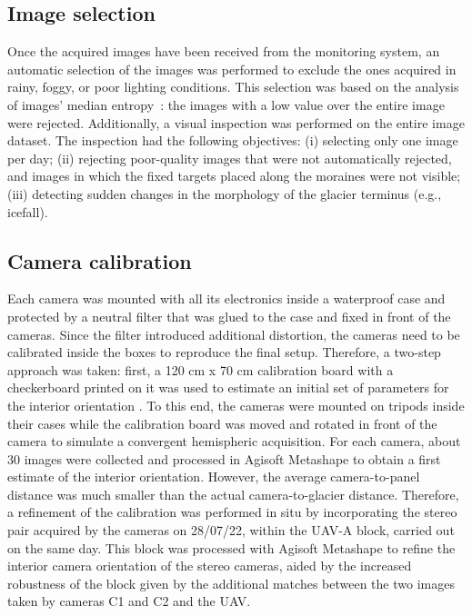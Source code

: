 \subsection{Image selection}\label{sec:4:imageselection}

Once the acquired images have been received from the monitoring system, an
automatic selection of the images was performed to exclude the ones acquired in rainy,
foggy, or poor lighting conditions.
This selection was based on the analysis of images' median
entropy~\citep{tsai2008entropy}:
the images with a low value over the entire image were rejected.
Additionally, a visual inspection was performed on the entire image dataset.
The inspection had the following objectives:
(i) selecting only one image per day;
(ii) rejecting poor-quality images that were not automatically rejected,
and images in which the fixed targets placed along the moraines were not visible;
(iii) detecting sudden changes in the morphology of the glacier
terminus (e.g., icefall).

\subsection{Camera calibration}\label{sec:4:cameracalibration}

Each camera was mounted with all its electronics inside a waterproof case and protected
by a neutral filter that was glued to the case and fixed in front of the cameras.
Since the filter introduced additional distortion, the cameras need to be calibrated
inside the boxes to reproduce the final setup.
Therefore, a two-step approach was taken: first, a 120 cm x 70 cm calibration board with
a checkerboard printed on it was used to estimate an initial set of parameters for the
interior orientation \citep{zhang_flexible_2000}.
To this end, the cameras were mounted on tripods inside their cases while the calibration
board was moved and rotated in front of the camera to simulate a convergent hemispheric
acquisition.
For each camera, about 30 images were collected and processed in Agisoft Metashape to
obtain a first estimate of the interior orientation.
However, the average camera-to-panel distance was much smaller than the actual
camera-to-glacier distance.
Therefore, a refinement of the calibration was performed in situ by incorporating the
stereo pair acquired by the cameras on 28/07/22, within the UAV-A block, carried out on
the same day.
This block was processed with Agisoft Metashape to refine the interior camera
orientation of the stereo cameras, aided by the increased robustness of the block given
by the additional matches between the two images taken by cameras C1 and C2 and the UAV.

